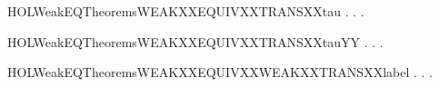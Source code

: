 \newcommand{\HOLWeakEQTheoremsWEAKXXEQUIVXXTRANSXXlabelYY}{\UseVerbatim{HOLWeakEQTheoremsWEAKXXEQUIVXXTRANSXXlabelYY}}
\begin{SaveVerbatim}{HOLWeakEQTheoremsWEAKXXEQUIVXXTRANSXXtau}
\HOLTokenTurnstile{} \HOLSymConst{\HOLTokenForall{}} .
          \HOLSymConst{\HOLTokenImp{}}
       \HOLSymConst{\HOLTokenForall{}}.  \HOLTokenTransBegin\HOLConst{\ensuremath{\tau}}\HOLTokenTransEnd {} \HOLSymConst{\HOLTokenImp{}} \HOLSymConst{\HOLTokenExists{}}.    \HOLSymConst{\HOLTokenConj{}}   
\end{SaveVerbatim}
\newcommand{\HOLWeakEQTheoremsWEAKXXEQUIVXXTRANSXXtau}{\UseVerbatim{HOLWeakEQTheoremsWEAKXXEQUIVXXTRANSXXtau}}
\begin{SaveVerbatim}{HOLWeakEQTheoremsWEAKXXEQUIVXXTRANSXXtauYY}
\HOLTokenTurnstile{} \HOLSymConst{\HOLTokenForall{}} .
          \HOLSymConst{\HOLTokenImp{}}
       \HOLSymConst{\HOLTokenForall{}}.  \HOLTokenTransBegin\HOLConst{\ensuremath{\tau}}\HOLTokenTransEnd {} \HOLSymConst{\HOLTokenImp{}} \HOLSymConst{\HOLTokenExists{}}.    \HOLSymConst{\HOLTokenConj{}}   
\end{SaveVerbatim}
\newcommand{\HOLWeakEQTheoremsWEAKXXEQUIVXXTRANSXXtauYY}{\UseVerbatim{HOLWeakEQTheoremsWEAKXXEQUIVXXTRANSXXtauYY}}
\begin{SaveVerbatim}{HOLWeakEQTheoremsWEAKXXEQUIVXXWEAKXXTRANSXXlabel}
\HOLTokenTurnstile{} \HOLSymConst{\HOLTokenForall{}} .
          \HOLSymConst{\HOLTokenImp{}}
       \HOLSymConst{\HOLTokenForall{}} .
            \HOLTokenWeakTransBegin{} \HOLTokenWeakTransEnd {} \HOLSymConst{\HOLTokenImp{}}
           \HOLSymConst{\HOLTokenExists{}}.  \HOLTokenWeakTransBegin{} \HOLTokenWeakTransEnd {} \HOLSymConst{\HOLTokenConj{}}   
\end{SaveVerbatim}
